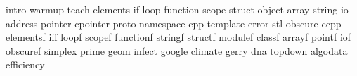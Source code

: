 intro
warmup
teach
elements
if
loop
function
scope
struct
object
array
string
io
address
pointer
cpointer
proto
namespace
cpp
template
error
stl
obscure
ccpp
elementsf
iff
loopf
scopef
functionf
stringf
structf
modulef
classf
arrayf
pointf
iof
obscuref
simplex
prime
geom
infect
google
climate
gerry
dna
topdown
algodata
efficiency
